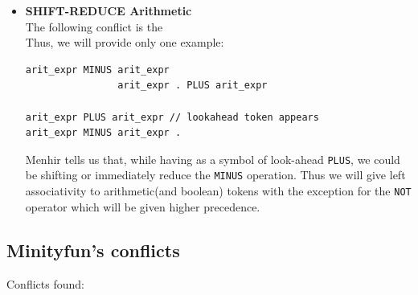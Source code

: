 \documentclass[a4paper,11pt]{report}
\begin{document}
\begin{itemize}
\begin{lstlisting}
    State2:
    command SEQ command // lookahead token appears
    command SEQ command .
    \end{lstlisting}
    
    The problem is that we do not spec\lstset{
  language=Python, %
  basicstyle=\ttfamily\small, %
  captionpos=b, %
}ify associativity: we choose to do it in the typical left associative way.\\
    \textbf{Solution}: we will give left-associativity using the Menhir-specific directive:\\
    \verb|%left SEQ|   
    
    \item \textbf{SHIFT-REDUCE Arithmetic}\\
    The following conflict is the  \\
    Thus, we will provide only one example:
        
    \begin{lstlisting}
arit_expr MINUS arit_expr 
                arit_expr . PLUS arit_expr 
                
arit_expr PLUS arit_expr // lookahead token appears
arit_expr MINUS arit_expr .
    \end{lstlisting}
    
    Menhir tells us that, while having as a symbol of look-ahead \verb|PLUS|, we could be shifting
    or immediately reduce the \verb|MINUS| operation.
    Thus we will give left associativity to arithmetic(and boolean) tokens with the exception for the \verb|NOT| operator which will be given higher precedence.
\end{itemize}

\subsection{Minityfun's conflicts}

Conflicts found:
\end{document}
